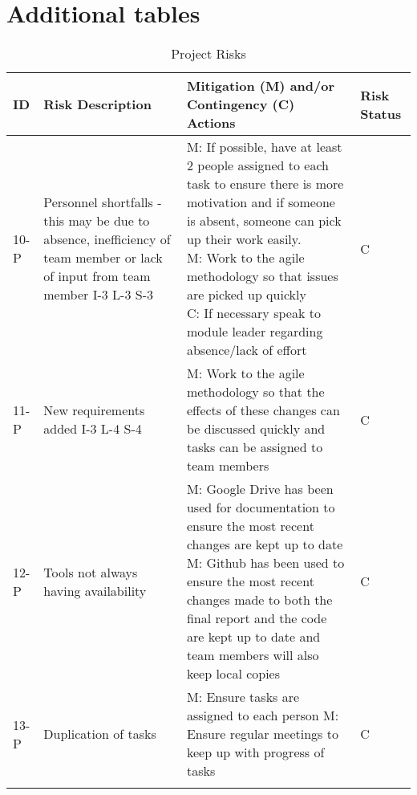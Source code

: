 \newcommand{\specialcell}[2][c]{%
  \begin{tabular}[#1]{@{}p{0.5\textwidth}@{}}#2\end{tabular}}

\section{Additional tables}
  
\begin{longtable}{|p{}|m{}|p{}|p{}|}
    \hline
        \textbf{ID} & \textbf{Risk Description} & \textbf{Mitigation (M) and/or Contingency (C) Actions} & \textbf{Risk Status} \\
    \hline
    10-P & Personnel shortfalls - this may be due to absence, inefficiency of team member or lack of input from team member
    I-3 L-3 S-3 & \specialcell{M: If possible, have at least 2 people assigned to each task to ensure there is more motivation and if someone is absent, someone can pick up their work easily.\\
    M: Work to the agile methodology so that issues are picked up quickly \\
    C: If necessary speak to module leader regarding absence/lack of effort} & C \\
    \hline
    11-P & New requirements added
    I-3 L-4 S-4 & M: Work to the agile methodology so that the effects of these changes can be discussed quickly and tasks can be assigned to team members & C \\
    \hline
    12-P & Tools not always having availability & \specialcell{M: Google Drive has been used for documentation to ensure the most recent changes are kept up to date\\
    M: Github has been used to ensure the most recent changes made to both the final report and the code are kept up to date and team members will also keep local copies} & C \\
    \hline
    13-P & Duplication of tasks & M: Ensure tasks are assigned to each person
    M: Ensure regular meetings to keep up with progress of tasks & C \\
    \hline
    \caption{Project Risks}
    \label{tab:projectrisks}
\end{longtable}


